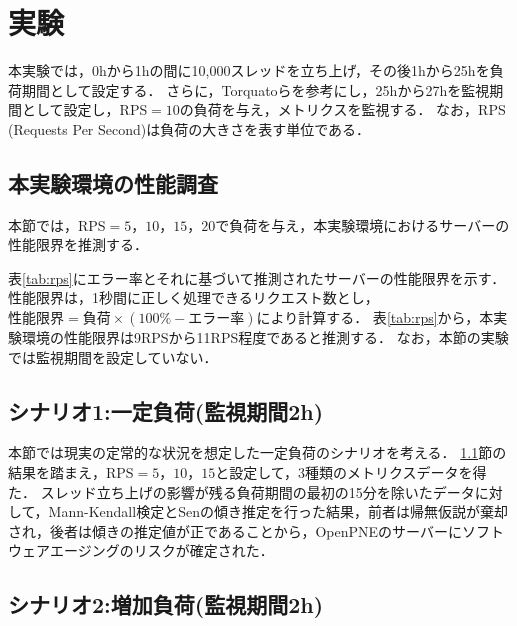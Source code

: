 \documentclass[twoside,twocolumn,10pt]{jarticle}  %
\begin{document}
\section{実験}
本実験では，0hから1hの間に10,000スレッドを立ち上げ，その後1hから25hを負荷期間として設定する．
さらに，Torquatoら\cite{Torquato2018SWAREa}を参考にし，25hから27hを監視期間として設定し，RPS$=10$の負荷を与え，メトリクスを監視する．
なお，RPS (Requests Per Second)は負荷の大きさを表す単位である．

\subsection{本実験環境の性能調査}
\label{subsec:limit}
本節では，RPS$=5，10，15，20$で負荷を与え，本実験環境におけるサーバーの性能限界を推測する．

表\ref{tab:rps}にエラー率とそれに基づいて推測されたサーバーの性能限界を示す．
性能限界は，1秒間に正しく処理できるリクエスト数とし，$性能限界=負荷\times(100\%-エラー率)$により計算する．
表\ref{tab:rps}から，本実験環境の性能限界は9RPSから11RPS程度であると推測する．
なお，本節の実験では監視期間を設定していない．

\subsection{シナリオ1:一定負荷(監視期間2h)}\label{subsec:load1}

本節では現実の定常的な状況を想定した一定負荷のシナリオを考える．
\ref{subsec:limit}節の結果を踏まえ，RPS$=5，10，15$と設定して，3種類のメトリクスデータを得た．
スレッド立ち上げの影響が残る負荷期間の最初の15分を除いたデータに対して，Mann-Kendall検定\cite{Mann1945Nonparametric}とSenの傾き推定\cite{Sen1968Estimates}を行った結果，前者は帰無仮説が棄却され，後者は傾きの推定値が正であることから，OpenPNEのサーバーにソフトウェアエージングのリスクが確定された．

\subsection{シナリオ2:増加負荷(監視期間2h)}\label{subsec:load2}
\end{document}
